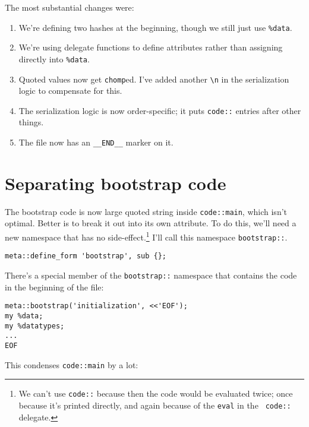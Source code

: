 \documentclass{report}
\begin{document}
    The most substantial changes were:

\begin{enumerate}
\item{We're defining two hashes at the beginning, though we still just use \verb|%data|.}
\item{We're using delegate functions to define attributes rather than assigning directly into \verb|%data|.}
\item{Quoted values now get {\tt chomp}ed. I've added another \verb|\n| in the serialization logic to compensate for this.}
\item{The serialization logic is now order-specific; it puts {\tt code::} entries after other things.}
\item{The file now has an \verb|__END__| marker on it.}
\end{enumerate}

\section{Separating bootstrap code}\label{sec:namespaces-separating-bootstrap-code}
    The bootstrap code is now large quoted string inside {\tt code::main}, which isn't optimal. Better is to break it out into its own attribute. To do this, we'll need a new namespace that
    has no side-effect.\footnote{We can't use {\tt code::} because then the code would be evaluated twice; once because it's printed directly, and again because of the {\tt eval} in the {\tt
    code::} delegate.} I'll call this namespace {\tt bootstrap::}.

\begin{verbatim}
meta::define_form 'bootstrap', sub {};
\end{verbatim}

    There's a special member of the {\tt bootstrap::} namespace that contains the code in the beginning of the file:

\begin{verbatim}
meta::bootstrap('initialization', <<'EOF');
my %data;
my %datatypes;
...
EOF
\end{verbatim}

    This condenses {\tt code::main} by a lot:

\end{document}
